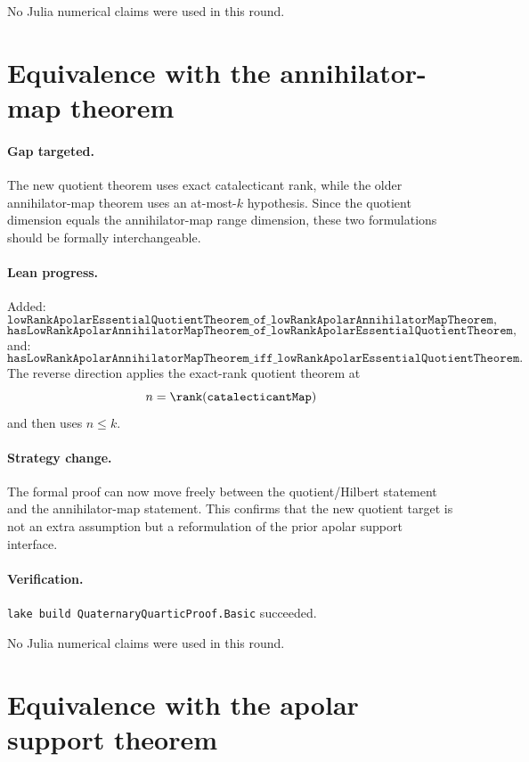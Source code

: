 \documentclass[11pt]{article}
\begin{document}
No Julia numerical claims were used in this round.

\section*{Equivalence with the annihilator-map theorem}

\paragraph{Gap targeted.}
The new quotient theorem uses exact catalecticant rank, while the older
annihilator-map theorem uses an at-most-\(k\) hypothesis.  Since the quotient
dimension equals the annihilator-map range dimension, these two formulations
should be formally interchangeable.

\paragraph{Lean progress.}
Added:
\[
\texttt{lowRankApolarEssentialQuotientTheorem\_of\_lowRankApolarAnnihilatorMapTheorem},
\]
\[
\texttt{hasLowRankApolarAnnihilatorMapTheorem\_of\_lowRankApolarEssentialQuotientTheorem},
\]
and:
\[
\texttt{hasLowRankApolarAnnihilatorMapTheorem\_iff\_lowRankApolarEssentialQuotientTheorem}.
\]
The reverse direction applies the exact-rank quotient theorem at
\[
n=\rank(\texttt{catalecticantMap})
\]
and then uses \(n\le k\).

\paragraph{Strategy change.}
The formal proof can now move freely between the quotient/Hilbert statement
and the annihilator-map statement.  This confirms that the new quotient target
is not an extra assumption but a reformulation of the prior apolar support
interface.

\paragraph{Verification.}
\texttt{lake build QuaternaryQuarticProof.Basic} succeeded.

No Julia numerical claims were used in this round.

\section*{Equivalence with the apolar support theorem}
\end{document}
